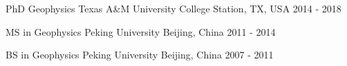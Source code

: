 

\begin{cventries}

  \cventry
    {PhD Geophysics} %
    {Texas A\&M University} %
    {College Station, TX, USA} %
    {2014 - 2018} %
    {
      \begin{cvitems} %
      \end{cvitems}
    }

  \cventry
    {MS in Geophysics} %
    {Peking University} %
    {Beijing, China} %
    {2011 - 2014} %
    {
      \begin{cvitems} %
      \end{cvitems}
    }

  \cventry
    {BS in Geophysics} %
    {Peking University} %
    {Beijing, China} %
    {2007 - 2011} %
    {
      \begin{cvitems} %
      \end{cvitems}
    }

\end{cventries}
